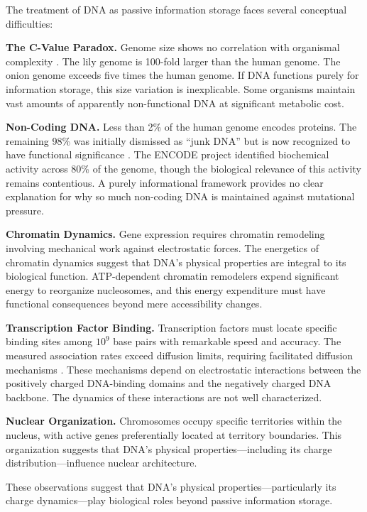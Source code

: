 \documentclass[twocolumn,10pt]{article}
\theoremstyle{remark}
\begin{document}
The treatment of DNA as passive information storage faces several conceptual difficulties:

\textbf{The C-Value Paradox.} Genome size shows no correlation with organismal complexity \citep{gregory2005c}. The lily genome is 100-fold larger than the human genome. The onion genome exceeds five times the human genome. If DNA functions purely for information storage, this size variation is inexplicable. Some organisms maintain vast amounts of apparently non-functional DNA at significant metabolic cost.

\textbf{Non-Coding DNA.} Less than 2\% of the human genome encodes proteins. The remaining 98\% was initially dismissed as ``junk DNA'' but is now recognized to have functional significance \citep{encode2012}. The ENCODE project identified biochemical activity across 80\% of the genome, though the biological relevance of this activity remains contentious. A purely informational framework provides no clear explanation for why so much non-coding DNA is maintained against mutational pressure.

\textbf{Chromatin Dynamics.} Gene expression requires chromatin remodeling involving mechanical work against electrostatic forces. The energetics of chromatin dynamics suggest that DNA's physical properties are integral to its biological function. ATP-dependent chromatin remodelers expend significant energy to reorganize nucleosomes, and this energy expenditure must have functional consequences beyond mere accessibility changes.

\textbf{Transcription Factor Binding.} Transcription factors must locate specific binding sites among $10^9$ base pairs with remarkable speed and accuracy. The measured association rates exceed diffusion limits, requiring facilitated diffusion mechanisms \citep{vonhippel2007facilitated}. These mechanisms depend on electrostatic interactions between the positively charged DNA-binding domains and the negatively charged DNA backbone. The dynamics of these interactions are not well characterized.

\textbf{Nuclear Organization.} Chromosomes occupy specific territories within the nucleus, with active genes preferentially located at territory boundaries. This organization suggests that DNA's physical properties---including its charge distribution---influence nuclear architecture.

These observations suggest that DNA's physical properties---particularly its charge dynamics---play biological roles beyond passive information storage.
\end{document}
